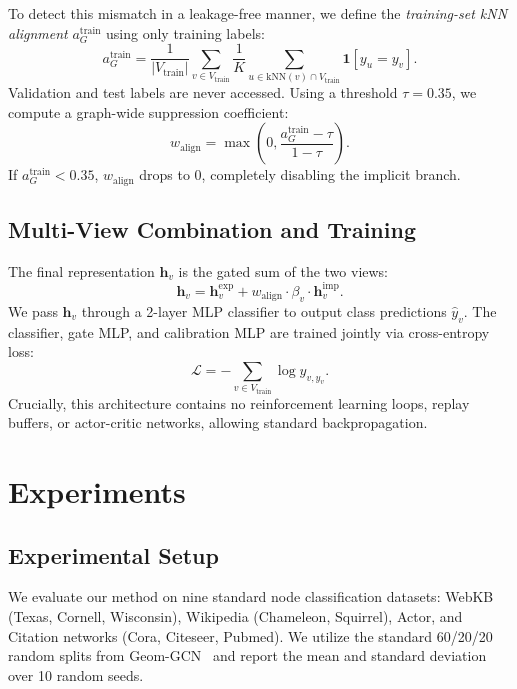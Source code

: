 \documentclass[letterpaper]{article}
\begin{document}
To detect this mismatch in a leakage-free manner, we define the \emph{training-set kNN alignment} $a_G^{\mathrm{train}}$ using only training labels:
\begin{equation}
  a_G^{\mathrm{train}} = \frac{1}{|V_{\mathrm{train}}|} \sum_{v \in V_{\mathrm{train}}} \frac{1}{K} \sum_{u \in \mathrm{kNN}(v) \cap V_{\mathrm{train}}} \mathbf{1}[y_u = y_v].
\end{equation}
Validation and test labels are never accessed. Using a threshold $\tau = 0.35$, we compute a graph-wide suppression coefficient:
\begin{equation}
  w_{\mathrm{align}} = \max\left(0, \frac{a_G^{\mathrm{train}} - \tau}{1 - \tau}\right).
\end{equation}
If $a_G^{\mathrm{train}} < 0.35$, $w_{\mathrm{align}}$ drops to 0, completely disabling the implicit branch.

\subsection{Multi-View Combination and Training}
The final representation $\mathbf{h}_v$ is the gated sum of the two views:
\begin{equation}
  \mathbf{h}_v = \mathbf{h}_v^{\mathrm{exp}} + w_{\mathrm{align}} \cdot \beta_v \cdot \mathbf{h}_v^{\mathrm{imp}}.
\end{equation}
We pass $\mathbf{h}_v$ through a 2-layer MLP classifier to output class predictions $\hat{y}_v$. The classifier, gate MLP, and calibration MLP are trained jointly via cross-entropy loss:
\begin{equation}
  \mathcal{L} = -\sum_{v \in V_{\mathrm{train}}} \log \hat{y}_{v, y_v}.
\end{equation}
Crucially, this architecture contains no reinforcement learning loops, replay buffers, or actor-critic networks, allowing standard backpropagation.

\section{Experiments}
\label{sec:experiments}

\subsection{Experimental Setup}
We evaluate our method on nine standard node classification datasets: WebKB (Texas, Cornell, Wisconsin), Wikipedia (Chameleon, Squirrel), Actor, and Citation networks (Cora, Citeseer, Pubmed). We utilize the standard 60/20/20 random splits from Geom-GCN~\cite{geomgcn2020} and report the mean and standard deviation over 10 random seeds.
\end{document}
